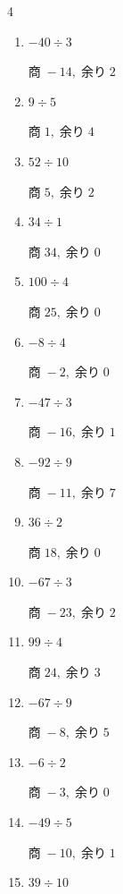 \begin{multicols}{4}
\begin{enumerate}
  \item $-40 \div 3$

        $商\; -14,\; 余り\; 2$

  \item $9 \div 5$

        $商\; 1,\; 余り\; 4$

  \item $52 \div 10$

        $商\; 5,\; 余り\; 2$

  \item $34 \div 1$

        $商\; 34,\; 余り\; 0$

  \item $100 \div 4$

        $商\; 25,\; 余り\; 0$

  \item $-8 \div 4$

        $商\; -2,\; 余り\; 0$

  \item $-47 \div 3$

        $商\; -16,\; 余り\; 1$

\columnbreak %

\resetques

  \item $-92 \div 9$

        $商\; -11,\; 余り\; 7$

  \item $36 \div 2$

        $商\; 18,\; 余り\; 0$

  \item $-67 \div 3$

        $商\; -23,\; 余り\; 2$

  \item $99 \div 4$

        $商\; 24,\; 余り\; 3$

  \item $-67 \div 9$

        $商\; -8,\; 余り\; 5$

  \item $-6 \div 2$

        $商\; -3,\; 余り\; 0$

  \item $-49 \div 5$

        $商\; -10,\; 余り\; 1$

  \item $39 \div 10$


\end{enumerate}
\end{multicols}
